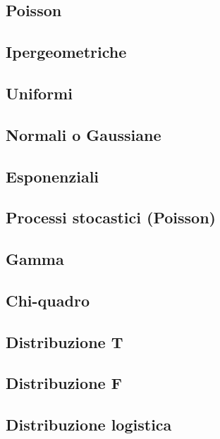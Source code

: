 \documentclass[]{article}
\begin{document}
    \subsection{Poisson}

    \subsection{Ipergeometriche}

    \subsection{Uniformi}

    \subsection{Normali o Gaussiane}

    \subsection{Esponenziali}

    \subsection{Processi stocastici (Poisson)}

    \subsection{Gamma}

    \subsection{Chi-quadro}

    \subsection{Distribuzione T}

    \subsection{Distribuzione F}

    \subsection{Distribuzione logistica}
\end{document}
